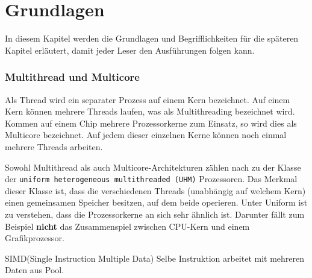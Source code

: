 \chapter{Grundlagen}
\label{sec:Grundlagen}

In diesem Kapitel werden die Grundlagen und Begrifflichkeiten für die späteren Kapitel erläutert, damit jeder Leser den Ausführungen folgen kann.

\subsection*{Multithread und Multicore}
Als Thread wird ein separater Prozess auf einem Kern bezeichnet. Auf einem Kern können mehrere Threads laufen, was als Multithreading bezeichnet wird. Kommen auf einem Chip mehrere Prozessorkerne zum Einsatz, so wird dies als Multicore bezeichnet. Auf jedem dieser einzelnen Kerne können noch einmal mehrere Threads arbeiten.

Sowohl Multithread als auch Multicore-Architekturen zählen nach \cite{GARCIA} zu der Klasse der \texttt{uniform heterogeneous multithreaded (UHM)} Prozessoren. Das Merkmal dieser Klasse ist, dass die verschiedenen Threads (unabhängig auf welchem Kern) einen gemeinsamen Speicher besitzen, auf dem beide operieren. Unter Uniform ist zu verstehen, dass die Prozessorkerne an sich sehr ähnlich ist. Darunter fällt zum Beispiel \textbf{nicht} das Zusammenspiel zwischen CPU-Kern und einem Grafikprozessor.

SIMD(Single Instruction Multiple Data) Selbe Instruktion arbeitet mit mehreren Daten aus Pool.

%

